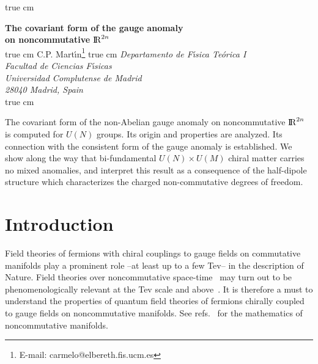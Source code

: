 \documentclass[a4paper,12pt]{article}
\def\RR{{\rm I\!\!\, R}}
\begin{document}
\begin{titlepage}


 true cm
\begin{center}
{\Large \bf The covariant form of the gauge anomaly\\[9pt]
on noncommutative $\RR^{2 n}$}\\ 
 true cm 
{\rm C.P. Mart\'{\i}n}\footnote{E-mail: carmelo@elbereth.fis.ucm.es}
 true cm
{\it Departamento de F\'{\i}sica Te\'orica I}\\
{\it Facultad de Ciencias F\'{\i}sicas}\\ 
{\it Universidad Complutense de Madrid}\\
{\it 28040 Madrid, Spain}\\
 true cm

{\leftskip=45pt \rightskip=45pt 
\noindent
The covariant form of the non-Abelian gauge anomaly on noncommutative 
$\RR^{2 n}$ is computed for $U(N)$ groups. Its origin and  properties  
are analyzed.  
Its connection with the consistent form of the gauge anomaly is established. 
We show along the way that bi-fundamental $U(N)\times U(M)$ chiral matter 
carries no mixed anomalies, and interpret this result as a consequence of 
the half-dipole structure which  characterizes the charged non-commutative 
degrees of freedom. \par }
\end{center}

\vfil



\end{titlepage}
\setcounter{page}{2}



\section{Introduction}

Field theories of fermions with chiral couplings to gauge fields on  
commutative manifolds play a prominent role --at least up to a few Tev-- in 
the description of Nature.
Field theories over noncommutative 
space-time~\cite{Douglas:2001ba, Szabo:2001kg} may 
turn out to be phenomenologically relevant at the Tev scale and 
above~\cite{Riad:2000vy, Arfaei:2000kh, Hewett:2001zp, Mathews:2001we, Baek:2001ty, Grosse:2001ei, Grosse:2001xz, 
Chaichian:2001py, Wang:2001ig}.
It is therefore a must to understand the properties of quantum 
field theories of fermions chirally coupled to gauge fields on
noncommutative manifolds. See refs.~\cite{Connes:1994, Madore:1999, Landi:1997sh, Gracia-Bondia:2001tr} for the mathematics of noncommutative manifolds.
\end{document}
